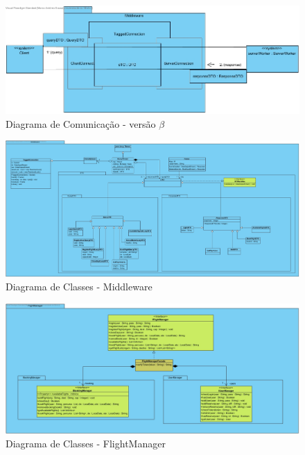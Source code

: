 \documentclass[a4paper,11pt]{scrreprt}
\begin{document}
\begin{landscape}
    \begin{figure}[!ht]
        \centering
        \includegraphics[width=\linewidth]{diagramas/MiddlewareCommunicationDiagram.jpg}
        \caption{Diagrama de Comunicação - versão $\beta$} \label{img:comunicacao}
    \end{figure}
\end{landscape}

\begin{landscape}
    \begin{figure}[!ht]
        \centering
        \includegraphics[width=\linewidth]{diagramas/MiddlewareClassDiagram.jpg}
        \caption{Diagrama de Classes - Middleware} \label{img:middleware}
    \end{figure}
\end{landscape}

\begin{landscape}
    \begin{figure}[!ht]
        \centering
        \includegraphics[width=\linewidth]{diagramas/FlightManager.jpg}
        \caption{Diagrama de Classes - FlightManager} \label{img:flight_manager}
    \end{figure}
\end{landscape}
\end{document}
